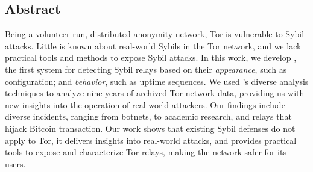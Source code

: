 \subsection*{Abstract}
Being a volunteer-run, distributed anonymity network, Tor is vulnerable to Sybil
attacks.  Little is known about real-world Sybils in the Tor network, and we
lack practical tools and methods to expose Sybil attacks.
%
In this work, we develop \sys, the first system for detecting Sybil relays based
on their \emph{appearance}, such as configuration; and \emph{behavior}, such as
uptime sequences.  We used \sys's diverse analysis techniques to analyze nine
years of archived Tor network data, providing us with new insights into the
operation of real-world attackers.  Our findings include diverse incidents,
ranging from botnets, to academic research, and relays that hijack Bitcoin
transaction.
%
Our work shows that existing Sybil defenses do not apply to Tor, it delivers
insights into real-world attacks, and provides practical tools to expose and
characterize Tor relays, making the network safer for its users.

